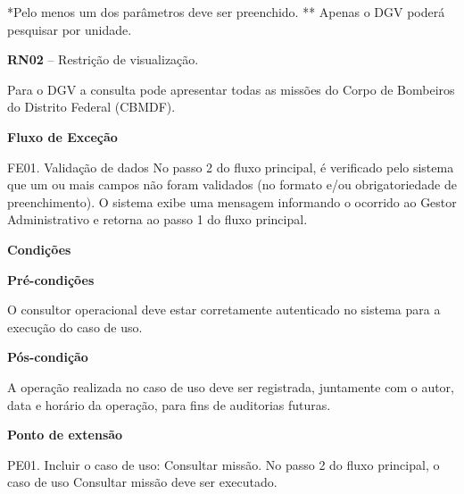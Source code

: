       *Pelo menos um dos parâmetros deve ser preenchido.
      ** Apenas o DGV poderá pesquisar por unidade.
   
   \textbf{RN02} – Restrição de visualização.
   
   Para o DGV a consulta pode apresentar todas as missões do Corpo de Bombeiros do Distrito Federal (CBMDF).
   
   {\raggedright
      \textbf{Fluxo de Exceção}
   }
   
   FE01. Validação de dados
	No passo 2 do fluxo principal, é verificado pelo sistema que um ou mais campos não foram validados (no formato e/ou
	obrigatoriedade de preenchimento). O sistema exibe uma mensagem informando o ocorrido ao Gestor Administrativo e retorna
	ao passo 1 do fluxo principal.

	
   {\raggedright
      \textbf{Condições}
   }
   
    
   \textbf{Pré-condições}
   
   O consultor operacional deve estar corretamente autenticado no sistema para a execução do caso de uso.
   
   \textbf{Pós-condição}
   
   A operação realizada no caso de uso deve ser registrada, juntamente com o autor, data e horário da operação, para fins de auditorias futuras.
   
   \textbf{Ponto de extensão}
   
   PE01. Incluir o caso de uso: Consultar missão.
   No passo 2 do fluxo principal, o caso de uso Consultar missão deve ser executado.
   
   \vfill
   \pagebreak